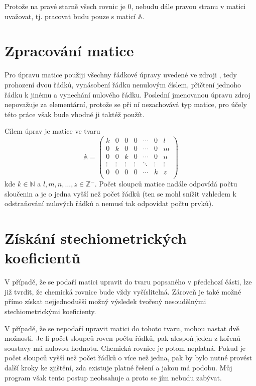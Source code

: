 \documentclass[12pt,a4paper]{report}
\begin{document}
Protože na pravé starně všech rovnic je 0, nebudu dále pravou stranu v matici uvažovat, tj. pracovat budu pouze s maticí $ \mathbb{A} $.

\section{Zpracování matice}
Pro úpravu matice použiji všechny řádkové úpravy uvedené ve zdroji \cite{czu}, tedy prohození dvou řádků, vynásobení řádku nenulovým číslem, přičtení jednoho řádku k jinému a vynechání nulového řádku. Poslední jmenovanou úpravu zdroj nepovažuje za elementární, protože se při ní nezachovává typ matice, pro účely této práce však bude vhodné ji taktéž použít.

Cílem úprav je matice ve tvaru
$$\mathbb{A} = \begin{pmatrix}
	k & 0 & 0 & 0 & \cdots & 0 & l \\
	0 & k & 0 & 0 & \cdots & 0 & m \\
	0 & 0 & k & 0 & \cdots & 0 & n \\
    \vdots&\vdots&\vdots&\vdots&\ddots&\vdots&\vdots \\
	0 & 0 & 0 & 0 & \cdots & k & z \\
\end{pmatrix}$$
kde $ k \in \mathbb{N} $ a $l,m,n,\ldots,z \in \mathbb{Z}^- $. Počet sloupců matice nadále odpovídá počtu sloučenin a je o jedna vyšší než počet řádků (ten se mohl snížit vzhledem k odstraňování nulových řádků a nemusí tak odpovídat počtu prvků).

\section{Získání stechiometrických koeficientů}
V případě, že se podaří matici upravit do tvaru popsaného v předchozí části, lze již tvrdit, že chemická rovnice bude vždy vyčíslitelná. Zároveň je také možné přímo získat nejjednodušší možný výsledek tvořený nesoudělnými stechiometrickými koeficienty.

V případě, že se nepodaří upravit matici do tohoto tvaru, mohou nastat dvě možnosti. Je-li počet sloupců roven počtu řádků, pak alespoň jeden z kořenů soustavy má nulovou hodnotu. Chemická rovnice je potom neplatná. Pokud je počet sloupců vyšší než počet řádků o více než jedna, pak by bylo nutné provést další kroky ke zjištění, zda existuje platné řešení a jakou má podobu. Můj program však tento postup neobsahuje a proto se jím nebudu zabývat.
\end{document}
